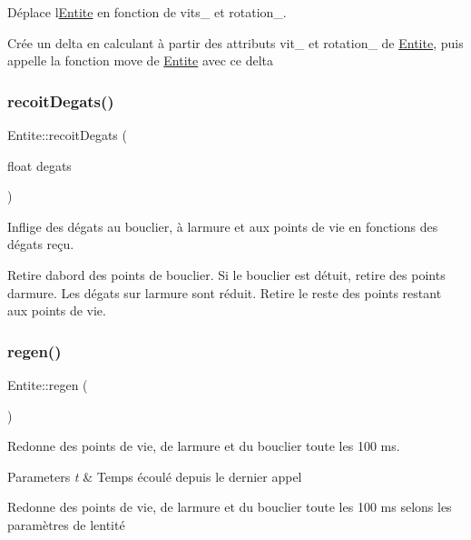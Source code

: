Déplace l\textquotesingle{}\mbox{\hyperlink{class_entite}{Entite}} en fonction de vits\+\_\+ et rotation\+\_\+. 

Crée un delta en calculant à partir des attributs vit\+\_\+ et rotation\+\_\+ de \mbox{\hyperlink{class_entite}{Entite}}, puis appelle la fonction move de \mbox{\hyperlink{class_entite}{Entite}} avec ce delta \mbox{\label{class_entite_ab16c58f618b3b854310f92f044cc4a17}} 
\subsubsection{\texorpdfstring{recoit\+Degats()}{recoitDegats()}}
{\footnotesize\ttfamily Entite\+::recoit\+Degats (\begin{DoxyParamCaption}\item[{float}]{degats }\end{DoxyParamCaption})}



Inflige des dégats au bouclier, à l\textquotesingle{}armure et aux points de vie en fonctions des dégats reçu. 

Retire d\textquotesingle{}abord des points de bouclier. Si le bouclier est détuit, retire des points d\textquotesingle{}armure. Les dégats sur l\textquotesingle{}armure sont réduit. Retire le reste des points restant aux points de vie. \mbox{\label{class_entite_a0107313e662166fddddb8ffefeb649fe}} 
\subsubsection{\texorpdfstring{regen()}{regen()}}
{\footnotesize\ttfamily Entite\+::regen (\begin{DoxyParamCaption}{ }\end{DoxyParamCaption})}



Redonne des points de vie, de l\textquotesingle{}armure et du bouclier toute les 100 ms. 


\begin{DoxyParams}{Parameters}
{\em t} & Temps écoulé depuis le dernier appel\\
\hline
\end{DoxyParams}
Redonne des points de vie, de l\textquotesingle{}armure et du bouclier toute les 100 ms selons les paramètres de l\textquotesingle{}entité \mbox{\label{class_entite_af1249039d313e4e691a109440663eae7}} 
